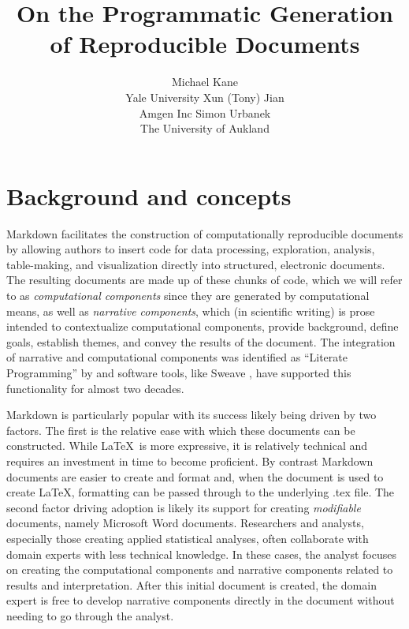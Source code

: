 \documentclass[
]{jss}
\author{
Michael Kane\\Yale University \And Xun (Tony) Jian\\Amgen Inc \And Simon
Urbanek\\The University of Aukland
}
\title{On the Programmatic Generation of Reproducible Documents}
\begin{document}
\hypertarget{background-and-concepts}{%
\section{Background and concepts}\label{background-and-concepts}}

 Markdown \citep{baumer2014} facilitates the construction of
computationally reproducible documents by allowing authors to insert
 code for data processing, exploration, analysis,
table-making, and visualization directly into structured, electronic
documents. The resulting documents are made up of these chunks of
 code, which we will refer to as \emph{computational
components} since they are generated by computational means, as well as
\emph{narrative components}, which (in scientific writing) is prose
intended to contextualize computational components, provide background,
define goals, establish themes, and convey the results of the document.
The integration of narrative and computational components was identified
as ``Literate Programming'' by \citet{knuth1984} and software tools,
like Sweave \citep{leisch2002}, have supported this functionality for
almost two decades.

 Markdown is particularly popular with its success likely
being driven by two factors. The first is the relative ease with which
these documents can be constructed. While \LaTeX ~is more expressive, it
is relatively technical and requires an investment in time to become
proficient. By contrast  Markdown documents are easier to
create and format and, when the document is used to create \LaTeX,
formatting can be passed through to the underlying .tex file. The second
factor driving adoption is likely its support for creating
\emph{modifiable} documents, namely Microsoft Word documents.
Researchers and analysts, especially those creating applied statistical
analyses, often collaborate with domain experts with less technical
knowledge. In these cases, the analyst focuses on creating the
computational components and narrative components related to results and
interpretation. After this initial document is created, the domain
expert is free to develop narrative components directly in the document
without needing to go through the analyst.
\end{document}
